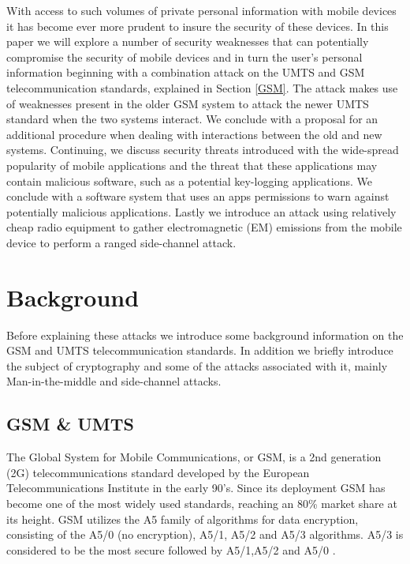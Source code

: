 \documentclass{sig-alternate}
\begin{document}

With access to such volumes of private personal information with mobile devices it has become ever more prudent to insure the security of these devices. In this paper we will explore a number of security weaknesses that can potentially compromise the security of mobile devices and in turn the user's personal information beginning with a combination attack on the UMTS and GSM telecommunication standards, explained in Section \ref{GSM}. The attack makes use of weaknesses present in the older GSM system to attack the newer UMTS standard when the two systems interact. We conclude with a proposal for an additional procedure when dealing with interactions between the old and new systems. Continuing, we discuss security threats introduced with the wide-spread popularity of mobile applications and the threat that these applications may contain malicious software, such as a potential key-logging applications. We conclude with a software system that uses an apps permissions to warn against potentially malicious applications. Lastly we introduce an attack using relatively cheap radio equipment to gather electromagnetic (EM) emissions from the mobile device to perform a ranged side-channel attack.         

\section{Background}
	
Before explaining these attacks we introduce some background information on the GSM and UMTS telecommunication standards. In addition we briefly introduce the subject of cryptography and some of the attacks associated with it, mainly Man-in-the-middle and side-channel attacks.    	
	\subsection{GSM \& UMTS \label{GSM}}
	The Global System for Mobile Communications, or GSM, is a 2nd generation (2G) telecommunications standard developed by the European Telecommunications Institute in the early 90's. Since its deployment GSM has become one of the most widely used standards, reaching an 80\% market share at its height. GSM utilizes the A5 family of algorithms for data encryption, consisting of the A5/0 (no encryption), A5/1, A5/2 and A5/3 algorithms. A5/3 is considered to be the most secure followed by A5/1,A5/2 and A5/0 \cite{wiki:GSM}.  
\end{document}
